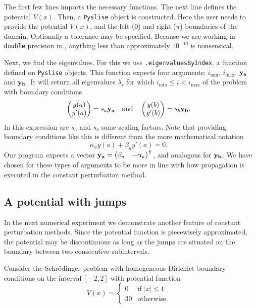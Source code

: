The first few lines imports the necessary functions. The next line defines the potential $V(x)$. Then, a \texttt{Pyslise} object is constructed. Here the user needs to provide the potential $V(x)$, and the left ($0$) and right ($\pi$) boundaries of the domain. Optionally a tolerance may be specified. Because we are working in \texttt{double} precision in \lpython{}, anything less than approximately $10^{-16}$ is nonsensical.

Next, we find the eigenvalues. For this we use \texttt{.eigenvaluesByIndex}, a function defined on \texttt{Pyslise} objects. This function expects four arguments: $i_\text{min}$, $i_\text{max}$, $\vb{y_a}$ and $\vb{y_b}$. It will return all eigenvalues $\lambda_i$ for which $i_\text{min} \leq i < i_\text{max}$ of the problem with boundary conditions
$$
    \begin{pmatrix}y(a) \\ y'(a)\end{pmatrix} = s_a \vb{y_a} \quad\text{and}\quad \begin{pmatrix}y(b) \\ y'(b)\end{pmatrix} = s_b \vb{y_b}\text{.}
$$
In this expression are $s_a$ and $s_b$ some scaling factors. Note that providing boundary conditions like this is different from the more mathematical notation
$$
    \alpha_a y(a) + \beta_a y'(a) = 0\text{.}
$$
Our program expects a vector $\vb{y_a} = \begin{pmatrix}\beta_a & - \alpha_a\end{pmatrix}^\intercal{}$, and analogous for $\vb{y_b}$. We have chosen for these types of arguments to be more in line with how propagation is executed in the constant perturbation method.

\subsection{A potential with jumps}\label{sec:c2_experiment_with_jumps}

In the next numerical experiment we demonstrate another feature of constant perturbation methods. Since the potential function is piecewisely approximated, the potential may be discontinuous as long as the jumps are situated on the boundary between two consecutive subintervals.

Consider the Schrödinger problem with homogeneous Dirichlet boundary conditions on the interval $[-2, 2]$ with potential function
\begin{equation}\label{equ:c2_matslise_jumps_well}
    V(x) = \begin{cases}
        0  & \text{if $|x| \leq 1$} \\
        30 & \text{otherwise.}
    \end{cases}
\end{equation}

